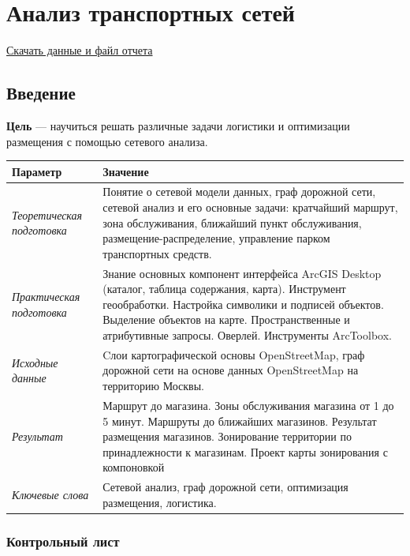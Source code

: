 \documentclass[12pt,]{book}
\begin{document}
\hypertarget{network-analysis}{%
\chapter{Анализ транспортных сетей}\label{network-analysis}}

\href{http://autolab.geogr.msu.ru/gis/data/Ex12.zip}{Скачать данные и файл отчета}

\hypertarget{network-analysis-intro}{%
\section{Введение}\label{network-analysis-intro}}

\textbf{Цель} --- научиться решать различные задачи логистики и оптимизации размещения с помощью сетевого анализа.

\begin{longtable}[]{@{}ll@{}}
\toprule
Параметр & Значение\tabularnewline
\midrule
\endhead
\emph{Теоретическая подготовка} & Понятие о сетевой модели данных, граф дорожной сети, сетевой анализ и его основные задачи: кратчайший маршрут, зона обслуживания, ближайший пункт обслуживания, размещение-распределение, управление парком транспортных средств.\tabularnewline
\emph{Практическая подготовка} & Знание основных компонент интерфейса ArcGIS Desktop (каталог, таблица содержания, карта). Инструмент геообработки. Настройка символики и подписей объектов. Выделение объектов на карте. Пространственные и атрибутивные запросы. Оверлей. Инструменты ArcToolbox.\tabularnewline
\emph{Исходные данные} & Cлои картографической основы OpenStreetMap, граф дорожной сети на основе данных OpenStreetMap на территорию Москвы.\tabularnewline
\emph{Результат} & Маршрут до магазина. Зоны обслуживания магазина от 1 до 5 минут. Маршруты до ближайших магазинов. Результат размещения магазинов. Зонирование территории по принадлежности к магазинам. Проект карты зонирования с компоновкой\tabularnewline
\emph{Ключевые слова} & Сетевой анализ, граф дорожной сети, оптимизация размещения, логистика.\tabularnewline
\bottomrule
\end{longtable}

\hypertarget{network-analysis-control}{%
\subsection{Контрольный лист}\label{network-analysis-control}}
\end{document}
